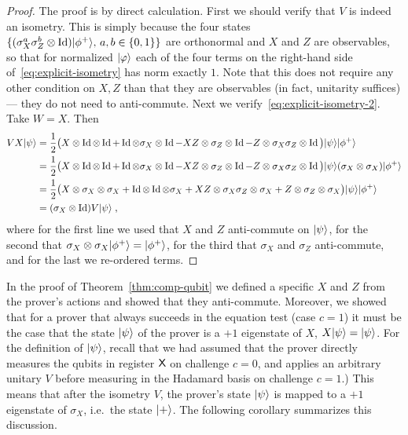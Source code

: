 \begin{proof}
The proof is by direct calculation. First we should verify that $V$ is indeed an isometry. This is simply because the four states $\{(\sigma_X^a\sigma_Z^b \otimes \mathop{\rm Id}\nolimits)|\phi^+\rangle,\, a,b\in\{0,1\}\}$ are orthonormal and $X$ and $Z$ are observables, so that for normalized $|\varphi\rangle$ each of the four terms on the right-hand side of~\eqref{eq:explicit-isometry} has norm exactly $1$. Note that this does not require any other condition on $X,Z$ than that they are observables (in fact, unitarity suffices) --- they do not need to anti-commute. Next we verify~\eqref{eq:explicit-isometry-2}. 
Take $W=X$. Then
\begin{align*}
 VX |\psi\rangle &= \frac{1}{2}\big(X \otimes \mathop{\rm Id}\nolimits\otimes \mathop{\rm Id}\nolimits + \mathop{\rm Id}\nolimits \otimes \sigma_X \otimes \mathop{\rm Id}\nolimits -XZ \otimes \sigma_Z \otimes \mathop{\rm Id}\nolimits -Z \otimes \sigma_X\sigma_Z \otimes \mathop{\rm Id}\nolimits\big) |\psi\rangle |\phi^+\rangle \\
&= \frac{1}{2}\big(X \otimes \mathop{\rm Id}\nolimits\otimes \mathop{\rm Id}\nolimits + \mathop{\rm Id}\nolimits \otimes \sigma_X \otimes \mathop{\rm Id}\nolimits -XZ \otimes \sigma_Z \otimes \mathop{\rm Id}\nolimits -Z \otimes \sigma_X\sigma_Z \otimes \mathop{\rm Id}\nolimits\big) |\psi\rangle (\sigma_X \otimes \sigma_X)|\phi^+\rangle \\
&= \frac{1}{2}\big(X \otimes \sigma_X \otimes \sigma_X + \mathop{\rm Id}\nolimits \otimes \mathop{\rm Id}\nolimits \otimes\sigma_X +XZ \otimes \sigma_X \sigma_Z \otimes \sigma_X +Z \otimes \sigma_Z \otimes \sigma_X\big) |\psi\rangle |\phi^+\rangle \\
&= (\sigma_X \otimes \mathop{\rm Id}\nolimits) V |\psi\rangle\;,
\end{align*}
where for the first line we used that $X$ and $Z$ anti-commute on $|\psi\rangle$, for the second that $\sigma_X\otimes \sigma_X |\phi^+\rangle = |\phi^+\rangle$, for the third that $\sigma_X$ and $\sigma_Z$ anti-commute, and for the last we re-ordered terms. 
\end{proof} 

In the proof of Theorem~\ref{thm:comp-qubit} we defined a specific $X$ and $Z$ from the prover's actions and showed that they anti-commute. Moreover, we showed that for a prover that always succeeds in the equation test (case $c=1$) it must be the case that the state $|\psi\rangle$ of the prover is a $+1$ eigenstate of $X$, $X|\psi\rangle=|\psi\rangle$. For the definition of $|\psi\rangle$, recall that we had assumed that the prover directly measures the qubits in register ${\textsf{X}}$ on challenge $c=0$, and applies an arbitrary unitary $V$ before measuring in the Hadamard basis on challenge $c=1$.) This means that after the isometry $V$, the prover's state $|\psi\rangle$ is mapped to a $+1$ eigenstate of $\sigma_X$, i.e.\ the state $|+\rangle$. The following corollary summarizes this discussion. 

